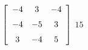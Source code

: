 {$\left[ \begin {array}{ccc} -4&3&-4\\\noalign{\medskip}-4&-5&3
\\\noalign{\medskip}3&-4&5\end {array} \right]$} 
{$15$}

  

 

